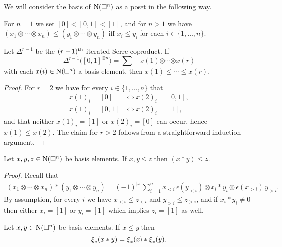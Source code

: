 We will consider the basis of $\operatorname{N}(\square^n)$ as a poset in the following way.

\begin{definition}
	For $n = 1$ we set $[0] < [0,1] < [1]$, and for $n > 1$ we have $(x_1 \otimes \cdots \otimes x_n) \leq (y_1 \otimes \cdots \otimes y_n)$ iff $x_i \leq y_i$ for each $i \in \{1, \dots, n\}$.
\end{definition}

\begin{lemma}
	Let $\Delta^{r-1}$ be the $(r-1)^{\mathrm{th}}$ iterated Serre coproduct.
	If
	\[
	\Delta^{r-1} \big([0,1]^{\otimes n}\big) =
	\sum \pm \ x{(1)} \bm{\otimes} \cdots \bm{\otimes} x{(r)}
	\]
	with each $x(i) \in \operatorname{N}(\square^n)$ a basis element, then $x{(1)} \leq \cdots \leq x{(r)}$.
\end{lemma}

\begin{proof}
	For $r = 2$ we have for every $i \in \{1, \dots, n\}$ that
	\begin{align*}
	x(1)_i = [0]   & \iff x(2)_i = [0,1], \\
	x(1)_i = [0,1] & \iff x(2)_i = [1],
	\end{align*}
	and that neither $x(1)_i = [1]$ or $x(2)_i = [0]$ can occur, hence $x(1) \leq x(2)$.
	The claim for $r > 2$ follows from a straightforward induction argument.
\end{proof}

\begin{lemma}
	Let $x, y, z \in \operatorname{N}(\square^n)$ be basis elements.
	If $x, y \leq z$ then $(x \ast y) \leq z$.
\end{lemma}

\begin{proof}
	Recall that
	\begin{align*}
	(x_1 \otimes \cdots \otimes x_n) \ast (y_1 \otimes \cdots \otimes y_n) =
	(-1)^{|x|} \sum_{i=1}^n x_{<i}\, \epsilon(y_{<i}) \otimes x_i \ast y_i \otimes \epsilon(x_{>i}) \, y_{>i}.
	\end{align*}
	By assumption, for every $i$ we have $x_{<i} \leq z_{<i}$ and $y_{>i} \leq z_{>i}$, and if $x_i \ast y_i \neq 0$ then either $x_i = [1]$ or $y_i = [1]$ which implies $z_i = [1]$ as well.
\end{proof}

\begin{lemma}
	Let $x, y \in \operatorname{N}(\square^n)$ be basis elements.
	If $x \leq y$ then
	\begin{equation} \label{e:cs collapse as algebra map}
	\operatorname{\xi}_\ast(x \ast y) = \operatorname{\xi}_\ast(x) \ast \operatorname{\xi}_\ast(y).
	\end{equation}
\end{lemma}

